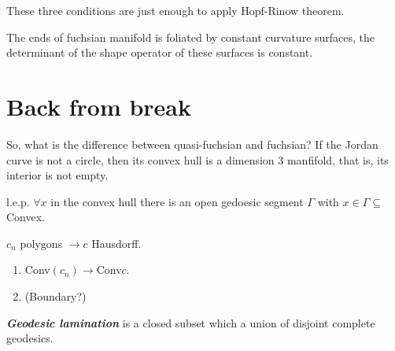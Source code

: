\begin{remark}\leavevmode
	These three conditions are just enough to apply Hopf-Rinow theorem.
\end{remark}

\begin{upshot}\leavevmode
	The ends of fuchsian manifold is foliated by constant curvature surfaces, the determinant of the shape operator of these surfaces is constant.
\end{upshot}

\section{Back from break}

So, what is the difference between quasi-fuchsian and fuchsian? If the Jordan curve is not a circle, then its convex hull is a dimension 3 manfifold, that is, its interior is not empty.

\begin{idea4}{l.e.p.}\leavevmode
	$\forall x$ in the convex hull there is an open gedoesic segment $\Gamma$ with $x\in\Gamma\subseteq$ Convex.
\end{idea4}

\begin{exercise}\leavevmode
	$c_n$ polygons $\longrightarrow c$ Hausdorff.
	\begin{enumerate}
		\item Conv$(c_n)\longrightarrow $Conv$c$.
	
		\item (Boundary?)
	\end{enumerate}
\end{exercise}

\begin{defn}\leavevmode
	\textit{\textbf{Geodesic lamination}} is a closed subset which a union of disjoint complete geodesics.
\end{defn}


